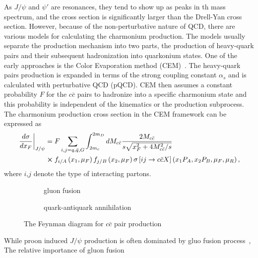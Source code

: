 \documentclass[../main.tex]{subfiles}
\begin{document}
As $J/\psi$ and $\psi'$ are resonances, they tend to show up as peaks in th mass spectrum,
and the cross section is significantly larger than the Drell-Yan cross section.
However, because of the non-perturbative nature of QCD, there are various models for
calculating the charmonium production. The models usually separate the production
mechanism into two parts, the production of heavy-quark pairs and their subsequent
hadronization into quarkonium states. One of the early approaches is the Color
Evaporation method (CEM)~\cite{einhorn1975,bodwin1995}. The heavy-quark
pairs production is expanded in terms of the strong coupling constant $\alpha_s$
and is calculated with perturbative QCD (pQCD). CEM then assumes a constant
probability $F$ for the $c\bar{c}$ pairs to hadronize into a specific charmonium
state and this probability is independent of the kinematics or the production
subprocess. The charmonium production cross section in the CEM framework can be
expressed as
\begin{equation}
	\begin{split}
		\left.\frac{d\sigma}{dx_F}\right|_{J/\psi} &= F \sum_{i,j = q,\bar{q},G}\int^{2m_D}_{2m_c} dM_{c\bar{c}}  \frac{2M_{c\bar{c}}}{s\sqrt{x_F^2+4M_{c\bar{c}}^2/s}}\\
		&\cross f_{i/A}\left(x_1,\mu_F\right)f_{j/B}\left(x_2,\mu_F\right)\sigma\left[ij\rightarrow c\bar{c}X\right]\left(x_1P_A,x_2P_B,\mu_F,\mu_R \right),
	\end{split}
\end{equation}
where $i$,$j$ denote the type of interacting partons. 
\begin{figure}[htpb!]
	\centering
	\begin{subfigure}{0.4\linewidth}
		\begin{subfigure}{\linewidth}
			
		\end{subfigure}
		\begin{subfigure}{\linewidth}
			
		\end{subfigure}
		\caption{gluon fusion\label{subfig:gluon}}
	\end{subfigure}
	\quad
	\begin{subfigure}{0.4\linewidth}
		
		\caption{quark-antiquark annihilation\label{subfig:qqbar}}
	\end{subfigure}
	\caption{The Feynman diagram for $c\bar{c}$ pair production}
	\label{fig:charmonium}
\end{figure}
While proon induced $J/\psi$ production is often dominated by gluo fusion
process~\cite{vogt1999}, The relative importance of gluon fusion
\end{document}
